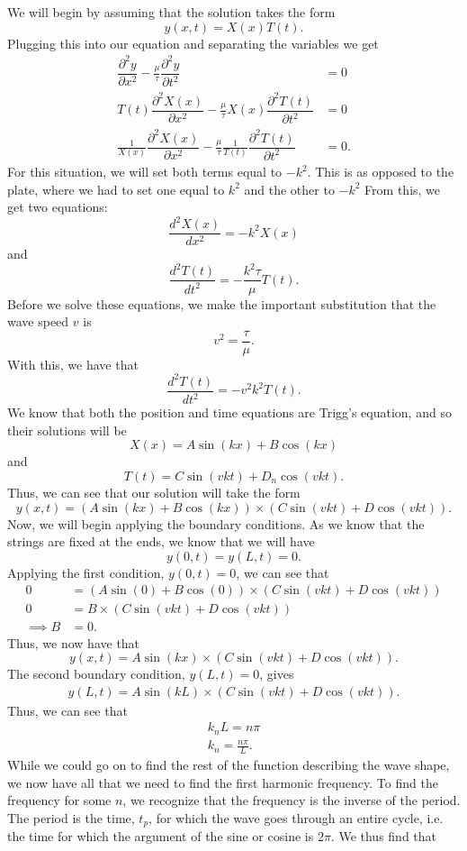 \documentclass[11pt]{report}
\newcommand{\sdel}[2]{\dfrac{\partial^2{#1}}{\partial{#2}^2}} %
\newcommand{\fpar}[1]{\left({#1}\right)}
\begin{document}
We will begin by assuming that the solution takes the form
    \[y(x,t)=X(x)T(t).\]
Plugging this into our equation and separating the variables we get
    \begin{align*}
        \sdel{y}{x}-\frac{\mu}{\tau}\sdel{y}{t}&=0\\
        T(t)\sdel{X(x)}{x}-\frac{\mu}{\tau}X(x)\sdel{T(t)}{t}&=0\\
        \frac{1}{X(x)}\sdel{X(x)}{x}-\frac{\mu}{\tau}\frac{1}{T(t)}\sdel{T(t)}{t}&=0.
    \end{align*}
For this situation, we will set both terms equal to $-k^2$. This is as opposed to the plate, where we had to set one equal to $k^2$ and the other to $-k^2$
From this, we get two equations:
    \[\frac{d^2X(x)}{dx^2}= -k^2X(x)\]
and
    \[\frac{d^2T(t)}{dt^2}=-\frac{k^2\tau}{\mu}T(t).\]
Before we solve these equations, we make the important substitution that the wave speed $v$ is
    \[v^2=\frac{\tau}{\mu}.\]
With this, we have that
    \[\frac{d^2T(t)}{dt^2}=-v^2k^2T(t).\]
We know that both the position and time equations are Trigg's equation, and so their solutions will be
    \[X(x)=A\sin\fpar{kx}+B\cos\fpar{kx}\]
and
    \[T(t)=C\sin\fpar{vkt}+D_n\cos\fpar{vkt}.\]
Thus, we can see that our solution will take the form
    \[y(x,t)=\fpar{A\sin\fpar{kx}+B\cos\fpar{kx}}\times\fpar{C\sin\fpar{vkt}+D\cos\fpar{vkt}}.\]
Now, we will begin applying the boundary conditions. As we know that the strings are fixed at the ends, we know that we will have
    \[y(0,t)=y(L,t)=0.\]
Applying the first condition, $y(0,t)=0$, we can see that
    \begin{align*}
        0 &= \fpar{A\sin\fpar{0}+B\cos\fpar{0}}\times\fpar{C\sin\fpar{vkt}+D\cos\fpar{vkt}}\\
        0 &= B\times\fpar{C\sin\fpar{vkt}+D\cos\fpar{vkt}}\\
        \implies B &= 0.
    \end{align*}
Thus, we now have that
    \[y(x,t)=A\sin\fpar{kx}\times\fpar{C\sin\fpar{vkt}+D\cos\fpar{vkt}}.\]
The second boundary condition, $y(L,t)=0$, gives
    \begin{align*}
        y(L,t)=A\sin\fpar{kL}\times\fpar{C\sin\fpar{vkt}+D\cos\fpar{vkt}}.
    \end{align*}
Thus, we can see that
    \begin{align*}
        k_nL = n\pi\\
        k_n = \frac{n\pi}{L}.
    \end{align*}
While we could go on to find the rest of the function describing the wave shape, we now have all that we need to find the first harmonic frequency. To find the frequency for some $n$, we recognize that the frequency is the inverse of the period. The period is the time, $t_p$, for which the wave goes through an entire cycle, i.e. the time for which the argument of the sine or cosine is $2\pi$. We thus find that
\end{document}
